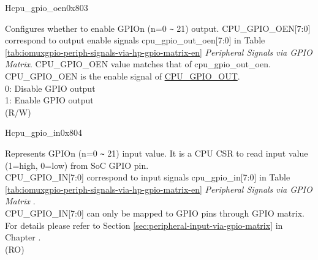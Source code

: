 \begin{register}{H}{cpu\_gpio\_oen}{0x803}\label{regdesc:GPIO_OEN}
%
%
%
%
%
%
%
%
%
\regnewline%
\begin{regdesc}\begin{reglist}
\label{fielddesc:GPIO_OEN}\item [CPU\_GPIO\_OEN] Configures whether to enable GPIOn (n=0 \verb+~+ 21) output. CPU\_GPIO\_OEN[7:0] correspond to output enable signals cpu\_gpio\_out\_oen[7:0] in Table \ref{tab:iomuxgpio-periph-signals-via-hp-gpio-matrix-en} \textit{Peripheral Signals via GPIO Matrix}. CPU\_GPIO\_OEN value matches that of cpu\_gpio\_out\_oen.
CPU\_GPIO\_OEN is the enable signal of \hyperref[fielddesc:GPIO_OUT]{CPU\_GPIO\_OUT}.\\
0: Disable GPIO output\\
1: Enable GPIO output\\
(R/W)
\end{reglist}\end{regdesc}
\end{register}

\begin{register}{H}{cpu\_gpio\_in}{0x804}\label{regdesc:GPIO_IN}
%
%
%
%
%
%
%
%
%
\regnewline%
\begin{regdesc}\begin{reglist}
\label{fielddesc:GPIO_IN}\item [CPU\_GPIO\_IN] Represents GPIOn (n=0 \verb+~+ 21) input value. It is a CPU CSR to read input value (1=high, 0=low) from SoC GPIO pin.\\
CPU\_GPIO\_IN[7:0] correspond to input signals cpu\_gpio\_in[7:0] in Table \ref{tab:iomuxgpio-periph-signals-via-hp-gpio-matrix-en} \textit{Peripheral Signals via GPIO Matrix} .\\
CPU\_GPIO\_IN[7:0] can only be mapped to GPIO pins through GPIO matrix. For details please refer to Section \ref{sec:peripheral-input-via-gpio-matrix} in Chapter \textit{}.\\
(RO)
\end{reglist}\end{regdesc}
\end{register}

